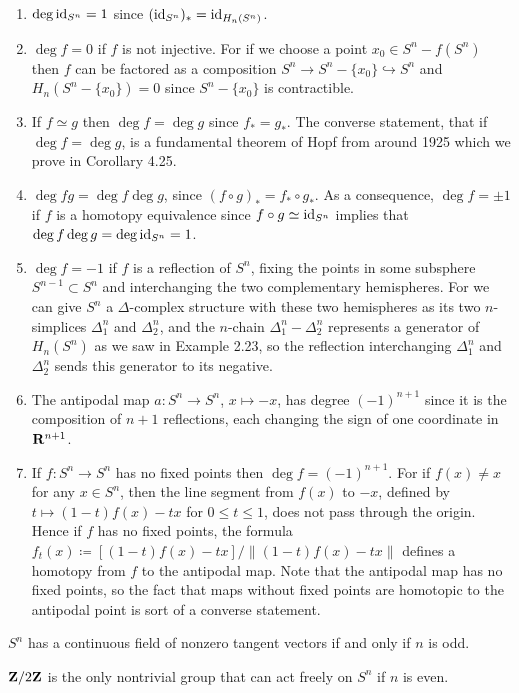 \begin{enumerate}[label=(\arabic*)]
\item $\deg\operatorname{id}_{S^n}=1$ since $(\operatorname{id}_{S^n})_*=\operatorname{id}_{H_n(S^n)}$.
\item $\deg f=0$ if $f$ is not injective. For if we choose a point $x_0\in
  S^n\minus f(S^n)$ then $f$ can be factored as a composition $S^n\to
  S^n\minus\{x_0\}\hookrightarrow S^n$ and $H_n(S^n\minus\{x_0\})=0$ since
  $S^n\minus\{x_0\}$ is contractible.
\item If $f\simeq g$ then $\deg f=\deg g$ since $f_*=g_*$. The converse
  statement, that if $\deg f=\deg g$, is a fundamental theorem of Hopf from
  around 1925 which we prove in Corollary 4.25.
\item $\deg fg=\deg f\deg g$, since $(f\circ g)_*=f_*\circ g_*$. As a
  consequence, $\deg f=\pm 1$ if $f$ is a homotopy equivalence since
  $f\circ g\simeq \operatorname{id}_{S^n}$ implies that $\deg f\deg g=\deg\operatorname{id}_{S^n}=1$.
\item $\deg f=-1$ if $f$ is a reflection of $S^n$, fixing the points in
  some subsphere $S^{n-1}\subset S^n$ and interchanging the two
  complementary hemispheres. For we can give $S^n$ a $\Delta$-complex
  structure with these two hemispheres as its two $n$-simplices
  $\Delta_1^n$ and $\Delta_2^n$, and the $n$-chain $\Delta_1^n-\Delta_2^n$
  represents a generator of $H_n(S^n)$ as we saw in Example 2.23, so the
  reflection interchanging $\Delta_1^n$ and $\Delta_2^n$ sends this
  generator to its negative.
\item The antipodal map $a\colon S^n\to S^n$, $x\mapsto -x$, has degree
  $(-1)^{n+1}$ since it is the composition of $n+1$ reflections, each
  changing the sign of one coordinate in $\mathbf{R}^{n+1}$.
\item If $f\colon S^n\to S^n$ has no fixed points then $\deg
  f=(-1)^{n+1}$. For if $f(x)\neq x$ for any $x\in S^n$, then the line
  segment from $f(x)$ to $-x$, defined by $t\mapsto(1-t)f(x)-tx$ for $0\leq
  t\leq 1$, does not pass through the origin. Hence if $f$ has no fixed
  points, the formula $f_t(x)\coloneqq[(1-t)f(x)-tx]/\|(1-t)f(x)-tx\|$
  defines a homotopy from $f$ to the antipodal map. Note that the antipodal
  map has no fixed points, so the fact that maps without fixed points are
  homotopic to the antipodal point is sort of a converse statement.
\end{enumerate}
\begin{theorem}[2.8]
$S^n$ has a continuous field of nonzero tangent vectors if and only if $n$
is odd.
\end{theorem}
\begin{proposition*}[2.29]
$\mathbf{Z}/2\mathbf{Z}$ is the only nontrivial group that can act freely on $S^n$ if
$n$ is even.
\end{proposition*}

